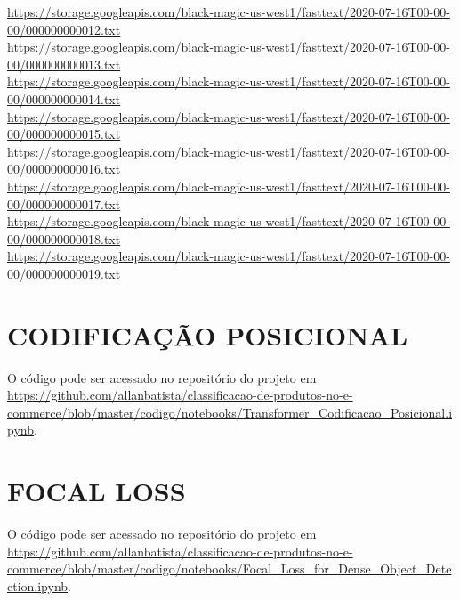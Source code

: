 \begin{apendicesenv}
\begin{simpletext}
\url{https://storage.googleapis.com/black-magic-us-west1/fasttext/2020-07-16T00-00-00/000000000012.txt} \\
\url{https://storage.googleapis.com/black-magic-us-west1/fasttext/2020-07-16T00-00-00/000000000013.txt} \\
\url{https://storage.googleapis.com/black-magic-us-west1/fasttext/2020-07-16T00-00-00/000000000014.txt} \\
\url{https://storage.googleapis.com/black-magic-us-west1/fasttext/2020-07-16T00-00-00/000000000015.txt} \\
\url{https://storage.googleapis.com/black-magic-us-west1/fasttext/2020-07-16T00-00-00/000000000016.txt} \\
\url{https://storage.googleapis.com/black-magic-us-west1/fasttext/2020-07-16T00-00-00/000000000017.txt} \\
\url{https://storage.googleapis.com/black-magic-us-west1/fasttext/2020-07-16T00-00-00/000000000018.txt} \\
\url{https://storage.googleapis.com/black-magic-us-west1/fasttext/2020-07-16T00-00-00/000000000019.txt}
\end{simpletext}

\chapter{CODIFICAÇÃO POSICIONAL}
\label{chap:transformer_codificao_posicional}

O código pode ser acessado no repositório do projeto em \url{https://github.com/allanbatista/classificacao-de-produtos-no-e-commerce/blob/master/codigo/notebooks/Transformer_Codificacao_Posicional.ipynb}.

\chapter{FOCAL LOSS}
\label{chap:focal_loss}

O código pode ser acessado no repositório do projeto em \url{https://github.com/allanbatista/classificacao-de-produtos-no-e-commerce/blob/master/codigo/notebooks/Focal_Loss_for_Dense_Object_Detection.ipynb}.


\end{apendicesenv}